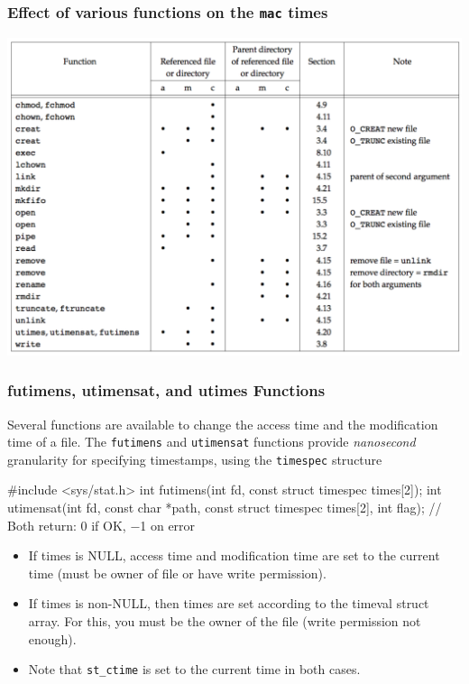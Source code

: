 \documentclass[newPxFont,sthlmFooter,nooffset]{beamer}
\begin{document}
\begin{frame}[t]
  \frametitle{Effect of various functions on the \texttt{mac} times}
\centering
\includegraphics[height=0.90\textheight]{figure/fig4_20_effect.png}
\end{frame}



\begin{frame}[containsverbatim,t]
  \frametitle{futimens, utimensat, and utimes Functions}
Several functions are available to change the access time and the modification time of a file. The \texttt{futimens} and \texttt{utimensat} functions provide \textit{nanosecond} granularity for specifying timestamps, using the \texttt{timespec} structure
\bigskip

\begin{codedef}
#include <sys/stat.h>
int futimens(int fd, const struct timespec times[2]);
int utimensat(int fd, const char *path, const struct timespec times[2], int flag);
// Both return: 0 if OK, −1 on error
\end{codedef}
{\footnotesize
\begin{itemize}
\item If times is NULL, access time and modification time are set to
  the current time (must be owner of file or have write permission).
\item If times is non-NULL, then times are set according to the timeval
  struct array. For this, you must be the owner of the file (write
  permission not enough).  \bigskip
\item Note that \texttt{st\_ctime} is set to the current time in both
  cases.  \bigskip
\end{itemize}
}
\end{frame}
\end{document}
